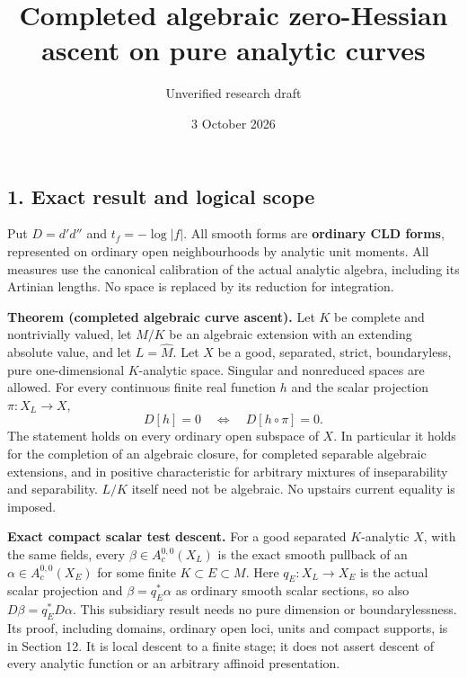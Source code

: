 \documentclass[
  11pt,
]{article}
\title{Completed algebraic zero-Hessian ascent on pure analytic curves}
\author{Unverified research draft}
\date{3 October 2026}
\begin{document}
\maketitle

\subsection{1. Exact result and logical
scope}\label{exact-result-and-logical-scope}

Put \(D=d'd''\) and \(t_f=-\log|f|\). All smooth forms are
\textbf{ordinary CLD forms}, represented on ordinary open neighbourhoods
by analytic unit moments. All measures use the canonical calibration of
the actual analytic algebra, including its Artinian lengths. No space is
replaced by its reduction for integration.

\textbf{Theorem (completed algebraic curve ascent).} Let \(K\) be
complete and nontrivially valued, let \(M/K\) be an algebraic extension
with an extending absolute value, and let \(L=\widehat M\). Let \(X\) be
a good, separated, strict, boundaryless, pure one-dimensional
\(K\)-analytic space. Singular and nonreduced spaces are allowed. For
every continuous finite real function \(h\) and the scalar projection
\(\pi:X_L\to X\), \[
             D[h]=0\quad\Longleftrightarrow\quad
             D[h\circ\pi]=0.                         \tag{1}
\] The statement holds on every ordinary open subspace of \(X\). In
particular it holds for the completion of an algebraic closure, for
completed separable algebraic extensions, and in positive characteristic
for arbitrary mixtures of inseparability and separability. \(L/K\)
itself need not be algebraic. No upstairs current equality is imposed.

\textbf{Exact compact scalar test descent.} For a good separated
\(K\)-analytic \(X\), with the same fields, every
\(\beta\in A_c^{0,0}(X_L)\) is the exact smooth pullback of an
\(\alpha\in A_c^{0,0}(X_E)\) for some finite \(K\subset E\subset M\).
Here \(q_E:X_L\to X_E\) is the actual scalar projection and
\(\beta=q_E^*\alpha\) as ordinary smooth scalar sections, so also
\(D\beta=q_E^*D\alpha\). This subsidiary result needs no pure dimension
or boundarylessness. Its proof, including domains, ordinary open loci,
units and compact supports, is in Section 12. It is local descent to a
finite stage; it does not assert descent of every analytic function or
an arbitrary affinoid presentation.
\end{document}
